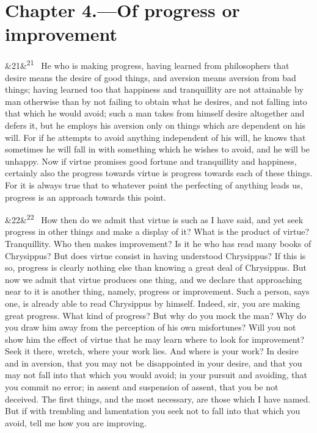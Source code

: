 \documentclass[12pt]{article}
\newcommand{\para}[1][]{\par\noindent\ifx&#1&\else\textsuperscript{\footnotesize #1}~\fi}
\begin{document}
\section*{Chapter 4.---Of progress or improvement}

\para[21] He who is making progress, having learned from philosophers that desire means the desire of good things, and aversion means aversion from bad things; having learned too that happiness and tranquillity are not attainable by man otherwise than by not failing to obtain what he desires, and not falling into that which he would avoid; such a man takes from himself desire altogether and defers it, but he employs his aversion only on things which are dependent on his will. For if he attempts to avoid anything independent of his will, he knows that sometimes he will fall in with something which he wishes to avoid, and he will be unhappy. Now if virtue promises good fortune and tranquillity and happiness, certainly also the progress towards virtue is progress towards each of these things. For it is always true that to whatever point the perfecting of anything leads us, progress is an approach towards this point.

\para[22] How then do we admit that virtue is such as I have said, and yet seek progress in other things and make a display of it? What is the product of virtue? Tranquillity. Who then makes improvement? Is it he who has read many books of Chrysippus? But does virtue consist in having understood Chrysippus? If this is so, progress is clearly nothing else than knowing a great deal of Chrysippus. But now we admit that virtue produces one thing, and we declare that approaching near to it is another thing, namely, progress or improvement. Such a person, says one, is already able to read Chrysippus by himself. Indeed, sir, you are making great progress. What kind of progress? But why do you mock the man? Why do you draw him away from the perception of his own misfortunes? Will you not show him the effect of virtue that he may learn where to look for improvement? Seek it there, wretch, where your work lies. And where is your work? In desire and in aversion, that you may not be disappointed in your desire, and that you may not fall into that which you would avoid; in your pursuit and avoiding, that you commit no error; in assent and suspension of assent, that you be not deceived. The first things, and the most necessary, are those which I have named. But if with trembling and lamentation you seek not to fall into that which you avoid, tell me how you are improving.
\end{document}
